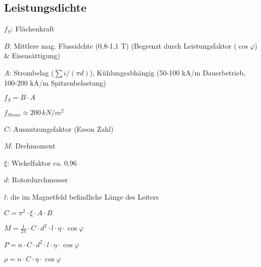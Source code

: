 \documentclass[german]{latex4ei/latex4ei_sheet}
\begin{document}
				\begin{sectionbox}
					\subsection{Leistungsdichte}
						\begin{bluebox}
							\item $f_S$: Flächenkraft
							\item $B$: Mittlere mag. Flussidchte (0,8-1,1 T) (Begrenzt durch Leistungsfaktor ($\cos \varphi$) \& Eisensättigung)
							\item $A$: Strombelag ($\sum i/(\pi d)$), Kühlungsabhängig (50-100 kA/m Dauerbetrieb, 100-200 kA/m Spitzenbelastung)
							\item $f_S = B\cdot A$
							\item $f_{Smax} \approx 200\, kN/m^2$
							\item $C$: Ausnutzungsfaktor (Esson Zahl)
							\item $M$: Drehmoment
							\item $\xi$: Wickelfaktor ca. 0,96
							\item $d$: Rotordurchmesser
							\item $l$: die im Magnetfeld befindliche Länge des Leiters
							\item $C = \pi^2 \cdot \xi\cdot A \cdot B$
							\item $M = \frac{1}{2\pi}\cdot C\cdot d^2\cdot l \cdot \eta \cdot \cos \varphi$
							\item $P = n \cdot C \cdot d^2 \cdot l \cdot \eta \cdot \cos \varphi$
							\item $\rho = n \cdot C \cdot \eta\cdot \cos \varphi$
						\end{bluebox}
				\end{sectionbox}
\end{document}
